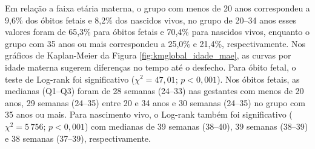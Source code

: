 \begin{table}[H]
\begin{tabular}{lll}
\end{tabular}
\label{tab:tabela-descritiva-conjunta} 
\end{table}

Em relação a faixa etária materna, o grupo com menos de 20 anos correspondeu a 9,6\% 
dos óbitos fetais e 8,2\% dos nascidos vivos, no grupo de 20--34 anos esses valores 
foram de 65,3\% para óbitos fetais e 70,4\% para nascidos vivos, enquanto o grupo 
com 35 anos ou mais correspondeu a 25,0\% e 21,4\%, respectivamente. Nos gráficos 
de Kaplan-Meier da Figura \ref{fig:kmglobal_idade_mae}, as curvas por idade materna 
sugerem diferenças no tempo até o desfecho. Para óbito fetal, o teste de Log-rank 
foi significativo ($\chi^2=47{,}01$; $p<0{,}001$). Nos óbitos fetais, as medianas 
(Q1--Q3) foram de 28 semanas (24--33) nas gestantes com menos de 20 anos, 29 semanas 
(24--35) entre 20 e 34 anos e 30 semanas (24--35) no grupo com 35 anos ou mais. Para 
nascimento vivo, o Log-rank também foi significativo ($\chi^2=5\,756$; $p<0{,}001$) 
com medianas de 39 semanas (38--40), 39 semanas (38--39) e 38 semanas (37--39), 
respectivamente. 


